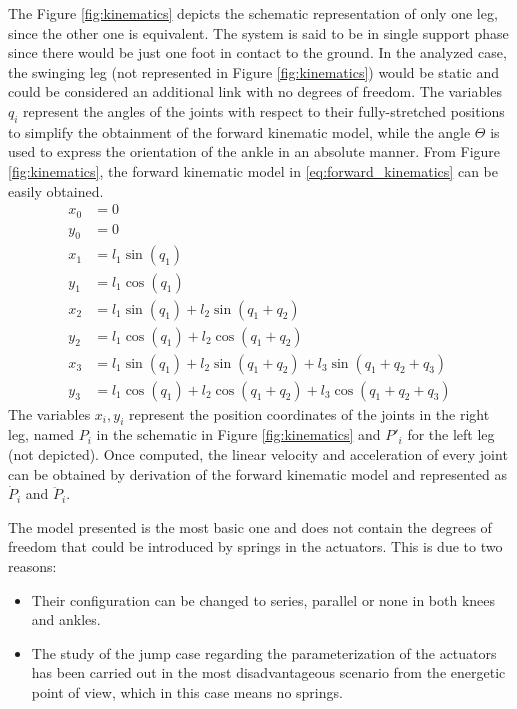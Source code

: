 The Figure \ref{fig:kinematics} depicts the schematic representation of only one leg, since the other one is equivalent. 
The system is said to be in single support phase since there would be just one foot in contact to the ground.
In the analyzed case, the swinging leg (not represented in Figure \ref{fig:kinematics}) would be static and could be considered an additional link with no degrees of freedom.
The variables $q_{i}$ represent the angles of the joints with respect to their fully-stretched positions to simplify the obtainment of the forward kinematic model, while the angle $\Theta$ is used to express the orientation of the ankle in an absolute manner. 
From Figure \ref{fig:kinematics}, the forward kinematic model in \ref{eq:forward_kinematics} can be easily obtained.
\begin{equation}
\label{eq:forward_kinematics}
	\begin{aligned}
		x_{0} &= 0 \\
		y_{0} &= 0 \\
		x_{1} &= l_{1} \sin(q_{1}) \\
		y_{1} &= l_{1} \cos(q_{1}) \\
		x_{2} &= l_{1} \sin(q_{1}) + l_{2} \sin(q_{1}+q_{2}) \\
		y_{2} &= l_{1} \cos(q_{1}) + l_{2} \cos(q_{1}+q_{2}) \\
		x_{3} &= l_{1} \sin(q_{1}) + l_{2} \sin(q_{1}+q_{2}) + l_{3} \sin(q_{1}+q_{2}+q_{3}) \\
		y_{3} &= l_{1} \cos(q_{1}) + l_{2} \cos(q_{1}+q_{2}) + l_{3} \cos(q_{1}+q_{2}+q_{3}) 
	\end{aligned}
\end{equation}
The variables $x_{i}, y_{i}$ represent the position coordinates of the joints in the right leg, named $P_{i}$ in the schematic in Figure \ref{fig:kinematics} and $P'_{i}$ for the left leg (not depicted).
Once computed, the linear velocity and acceleration of every joint can be obtained by derivation of the forward kinematic model and represented as $\dot{P}_{i}$ and $\ddot{P}_{i}$.

The model presented is the most basic one and does not contain the degrees of freedom that could be introduced by springs in the actuators.
This is due to two reasons:
\begin{itemize}
	\item Their configuration can be changed to series, parallel or none in both knees and ankles.
	\item The study of the jump case regarding the parameterization of the actuators has been carried out in the most disadvantageous scenario from the energetic point of view, which in this case means no springs.
\end{itemize}


